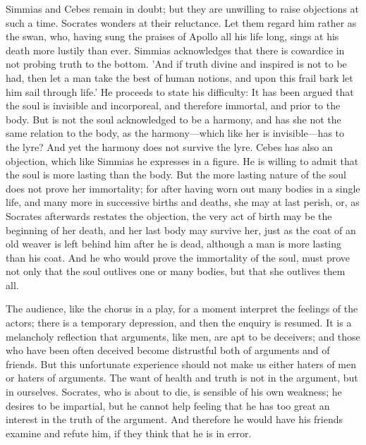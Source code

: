 Simmias and Cebes remain in doubt; but they are unwilling to raise
objections at such a time. Socrates wonders at their reluctance. Let them
regard him rather as the swan, who, having sung the praises of Apollo all
his life long, sings at his death more lustily than ever. Simmias
acknowledges that there is cowardice in not probing truth to the bottom.
'And if truth divine and inspired is not to be had, then let a man take
the best of human notions, and upon this frail bark let him sail through
life.' He proceeds to state his difficulty: It has been argued that the
soul is invisible and incorporeal, and therefore immortal, and prior to
the body. But is not the soul acknowledged to be a harmony, and has she
not the same relation to the body, as the harmony—which like her is
invisible—has to the lyre? And yet the harmony does not survive the
lyre. Cebes has also an objection, which like Simmias he expresses in a
figure. He is willing to admit that the soul is more lasting than the
body. But the more lasting nature of the soul does not prove her
immortality; for after having worn out many bodies in a single life, and
many more in successive births and deaths, she may at last perish, or, as
Socrates afterwards restates the objection, the very act of birth may be
the beginning of her death, and her last body may survive her, just as the
coat of an old weaver is left behind him after he is dead, although a man
is more lasting than his coat. And he who would prove the immortality of
the soul, must prove not only that the soul outlives one or many bodies,
but that she outlives them all.

The audience, like the chorus in a play, for a moment interpret the
feelings of the actors; there is a temporary depression, and then the
enquiry is resumed. It is a melancholy reflection that arguments, like
men, are apt to be deceivers; and those who have been often deceived
become distrustful both of arguments and of friends. But this unfortunate
experience should not make us either haters of men or haters of arguments.
The want of health and truth is not in the argument, but in ourselves.
Socrates, who is about to die, is sensible of his own weakness; he desires
to be impartial, but he cannot help feeling that he has too great an
interest in the truth of the argument. And therefore he would have his
friends examine and refute him, if they think that he is in error.

